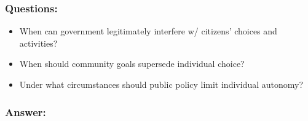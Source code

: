 \documentclass[aspectratio=169]{beamer}
\theoremstyle{principle}
\begin{document}
\begin{frame}
\frametitle{Questions:}
\begin{itemize}
\item When can government legitimately interfere w/ citizens' choices and activities?
\bigskip
\bigskip
\item When should community goals supersede individual choice? 
\bigskip
\bigskip
\item Under what circumstances should public policy limit individual autonomy?
\end{itemize}

\end{frame}

\begin{frame}
\frametitle{Answer:}
\begin{columns}
\begin{column}{0.5\textwidth}


\end{column}
\end{columns}
\end{frame}
\end{document}
